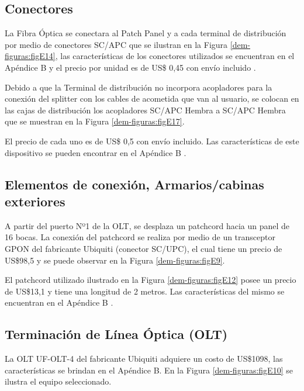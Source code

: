 \subsection{Conectores}
La Fibra Óptica se conectara al Patch Panel y a cada terminal de distribución por medio de conectores SC/APC que se ilustran en la Figura \ref{dem-figuras:figE14}, las características de los conectores utilizados se encuentran en el Apéndice B \cite{apendice-b} y el precio por unidad es de US\$ 0,45 con envío incluido \cite{conector-sc-apc}.

Debido a que la Terminal de distribución no incorpora acopladores para la conexión del splitter con los cables de acometida que van al usuario, se colocan en las cajas de distribución los acopladores SC/APC Hembra a SC/APC Hembra que se muestran en la Figura \ref{dem-figuras:figE17}.

El precio de cada uno es de US\$ 0,5 \cite{acople-sc-apc} con envío incluido. Las características de este dispositivo se pueden encontrar en el Apéndice B \cite{apendice-b}.


\subsection{Elementos de conexión, Armarios/cabinas exteriores}
A partir del puerto Nº1 de la OLT, se desplaza un patchcord hacia un panel de 16 bocas. La conexión del  patchcord se realiza por medio de un transceptor GPON del fabricante Ubiquiti (conector SC/UPC), el cual tiene un precio de  US\$98,5 \cite{transceptor} y se puede observar en la Figura \ref{dem-figuras:figE9}.


El patchcord utilizado ilustrado en la Figura \ref{dem-figuras:figE12} posee un precio de US\$13,1 \cite{patchcord-sc-apc} y tiene una longitud de 2 metros. Las características del mismo se encuentran en el Apéndice B \cite{apendice-b}.


\subsection{Terminación de Línea Óptica (OLT)}
La OLT UF-OLT-4 del fabricante Ubiquiti adquiere un costo de US\$1098, las características se brindan en el Apéndice B. En la Figura \ref{dem-figuras:figE10} se ilustra el equipo seleccionado.

